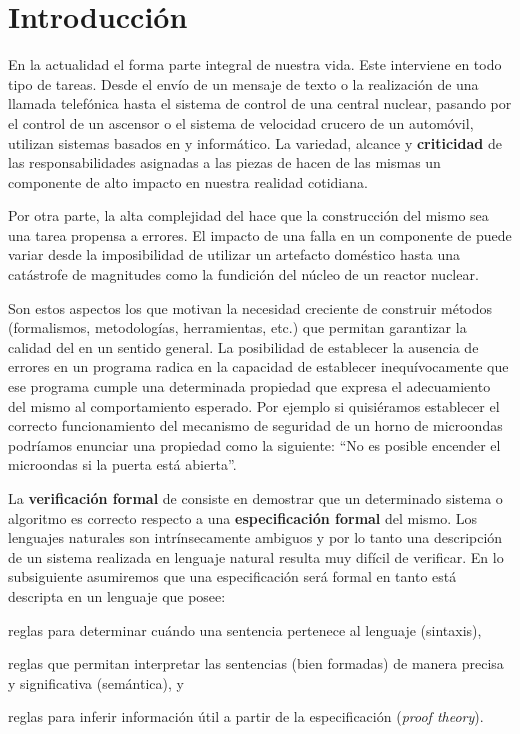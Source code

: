 
\chapter{Introducción} 
\label{intro}

En la actualidad el \soft forma parte integral de nuestra vida. Este interviene en todo tipo de tareas. Desde el envío de un mensaje de texto
o la realización de una llamada telefónica hasta el sistema de control de una
central nuclear, pasando por el control de un ascensor o el sistema de
velocidad crucero de un automóvil, utilizan sistemas basados en \hard y \soft
informático. La variedad, alcance y \textbf{criticidad} de las
responsabilidades asignadas a las piezas de \soft hacen de las mismas un
componente de alto impacto en nuestra realidad cotidiana.

Por otra parte, la alta complejidad del \soft hace que la construcción del
mismo sea una tarea propensa a errores. El impacto de una falla en un
componente de \soft puede variar desde la imposibilidad de utilizar un
artefacto doméstico hasta una catástrofe de magnitudes como la fundición del
núcleo de un reactor nuclear.

Son estos aspectos los que motivan la necesidad creciente de construir métodos
(formalismos, metodologías, herramientas, etc.) que permitan garantizar la
calidad del \soft en un sentido general. La posibilidad de establecer la
ausencia de errores en un programa radica en la capacidad de establecer
inequívocamente que ese programa cumple una determinada propiedad que expresa
el adecuamiento del mismo al comportamiento esperado. Por ejemplo si
quisiéramos establecer el correcto  funcionamiento del mecanismo de seguridad
de un horno de microondas podríamos enunciar una propiedad como la siguiente:
``No es posible encender el microondas si la puerta está abierta''.

La \textbf{verificación formal} de \soft consiste en demostrar que un
determinado sistema o algoritmo es correcto respecto a una
\textbf{especificación formal} del mismo. Los lenguajes naturales son
intrínsecamente ambiguos y por lo tanto una descripción de un sistema
realizada en lenguaje natural resulta muy difícil de verificar. En lo
subsiguiente asumiremos que una especificación será formal en tanto está
descripta en un lenguaje que posee:  \begin{inparaenum}[a)]  \item reglas para
determinar cuándo una sentencia pertenece al lenguaje (sintaxis),  \item
reglas que permitan interpretar las sentencias (bien formadas) de manera
precisa y significativa (semántica), y  \item reglas para inferir información
útil a partir de la especificación (\emph{proof theory}).  \end{inparaenum}

